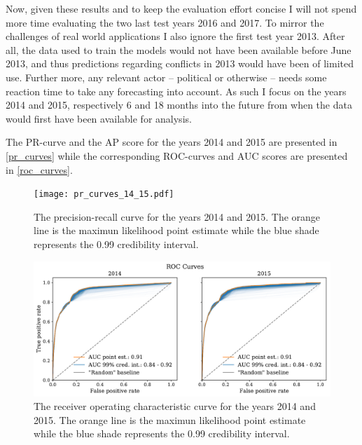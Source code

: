 \documentclass[a4paper]{article}
\begin{document}
Now, given these results and to keep the evaluation effort concise I will not spend more time evaluating the two last test years 2016 and 2017. To mirror the challenges of real world applications I also ignore the first test year 2013. After all, the data used to train the models would not have been available before June 2013, and thus predictions regarding conflicts in 2013 would have been of limited use. Further more, any relevant actor -- political or otherwise -- needs some reaction time to take any forecasting into account. As such I focus on the years 2014 and 2015, respectively 6 and 18 months into the future from when the data would first have been available for analysis.\par

The PR-curve and the AP score for the years 2014 and 2015 are presented in \autoref{pr_curves} while the corresponding ROC-curves and AUC scores are presented in \autoref{roc_curves}.\par 

\begin{figure}[!htb]
	\centering
	\texttt{[image: pr\_curves\_14\_15.pdf]}%
    \caption{\footnotesize{The precision-recall curve for the years 2014 and 2015. The orange line is the maximun likelihood point estimate while the blue shade represents the 0.99 credibility interval.}}\label{pr_curves}
\end{figure}

\begin{figure}[!htb]
	\centering
	\includegraphics[scale=0.47]{roc_curves_14_15.pdf}
    \caption{\footnotesize{The receiver operating characteristic curve for the years 2014 and 2015. The orange line is the maximun likelihood point estimate while the blue shade represents the 0.99 credibility interval.}}\label{roc_curves}
\end{figure}
\end{document}
